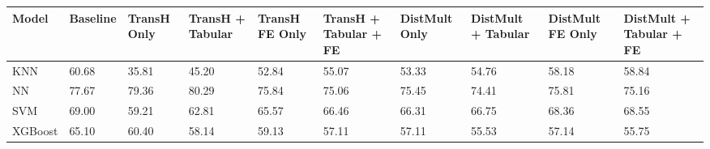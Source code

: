 \begin{tabular}{llllllllll}
\toprule
Model & Baseline & TransH Only & TransH + Tabular & TransH FE Only & TransH + Tabular + FE & DistMult Only & DistMult + Tabular & DistMult FE Only & DistMult + Tabular + FE \\
\midrule
KNN & 60.68 & 35.81 & 45.20 & 52.84 & 55.07 & 53.33 & 54.76 & 58.18 & 58.84 \\
NN & 77.67 & 79.36 & 80.29 & 75.84 & 75.06 & 75.45 & 74.41 & 75.81 & 75.16 \\
SVM & 69.00 & 59.21 & 62.81 & 65.57 & 66.46 & 66.31 & 66.75 & 68.36 & 68.55 \\
XGBoost & 65.10 & 60.40 & 58.14 & 59.13 & 57.11 & 57.11 & 55.53 & 57.14 & 55.75 \\
\bottomrule
\end{tabular}
